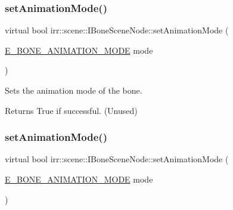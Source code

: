 \mbox{\label{classirr_1_1scene_1_1IBoneSceneNode_a424a467f045e809bcad2aa239edb9994}} 
\subsubsection{\texorpdfstring{set\+Animation\+Mode()}{setAnimationMode()}\hspace{0.1cm}{\footnotesize\ttfamily [1/2]}}
{\footnotesize\ttfamily virtual bool irr\+::scene\+::\+I\+Bone\+Scene\+Node\+::set\+Animation\+Mode (\begin{DoxyParamCaption}\item[{\hyperlink{namespaceirr_1_1scene_a318162c0a3aad1cf228ed7daddd44801}{E\+\_\+\+B\+O\+N\+E\+\_\+\+A\+N\+I\+M\+A\+T\+I\+O\+N\+\_\+\+M\+O\+DE}}]{mode }\end{DoxyParamCaption})\hspace{0.3cm}{\ttfamily [pure virtual]}}



Sets the animation mode of the bone. 

\begin{DoxyReturn}{Returns}
True if successful. (Unused) 
\end{DoxyReturn}
\mbox{\label{classirr_1_1scene_1_1IBoneSceneNode_a424a467f045e809bcad2aa239edb9994}} 
\subsubsection{\texorpdfstring{set\+Animation\+Mode()}{setAnimationMode()}\hspace{0.1cm}{\footnotesize\ttfamily [2/2]}}
{\footnotesize\ttfamily virtual bool irr\+::scene\+::\+I\+Bone\+Scene\+Node\+::set\+Animation\+Mode (\begin{DoxyParamCaption}\item[{\hyperlink{namespaceirr_1_1scene_a318162c0a3aad1cf228ed7daddd44801}{E\+\_\+\+B\+O\+N\+E\+\_\+\+A\+N\+I\+M\+A\+T\+I\+O\+N\+\_\+\+M\+O\+DE}}]{mode }\end{DoxyParamCaption})\hspace{0.3cm}{\ttfamily [pure virtual]}}



